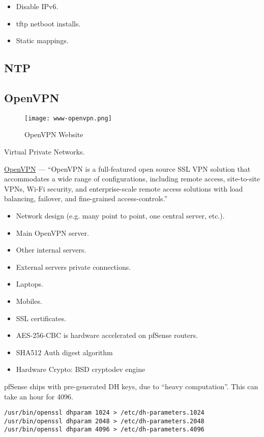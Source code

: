\begin{itemize}
 \item Disable IPv6.
 \item tftp netboot installs.
 \item Static mappings.
\end{itemize}


\subsection{NTP}


\subsection{OpenVPN}
\begin{figure}[h!]
\texttt{[image: www-openvpn.png]}
 \caption{OpenVPN Website}
 \label{fig:www-openvpn}
\end{figure}


Virtual Private Networks.


\href{https://www.openvpn.net/}{OpenVPN} --- ``OpenVPN is a full-featured open source SSL VPN solution that accommodates a wide range of configurations, including remote access, site-to-site VPNs, Wi-Fi security, and enterprise-scale remote access solutions with load balancing, failover, and fine-grained access-controls.''

\begin{itemize}
 \item Network design (e.g. many point to point, one central server, etc.).
 \item Main OpenVPN server.
 \item Other internal servers.
 \item External servers private connections.
 \item Laptops.
 \item Mobiles.
 \item SSL certificates.
 \item AES-256-CBC is hardware accelerated on pfSense routers.
 \item SHA512 Auth digest algorithm
 \item Hardware Crypto: BSD cryptodev engine
\end{itemize}


pfSense ships with pre-generated DH keys, due to ``heavy computation''.
This can take an hour for 4096.
\begin{verbatim}
/usr/bin/openssl dhparam 1024 > /etc/dh-parameters.1024
/usr/bin/openssl dhparam 2048 > /etc/dh-parameters.2048
/usr/bin/openssl dhparam 4096 > /etc/dh-parameters.4096
\end{verbatim}



